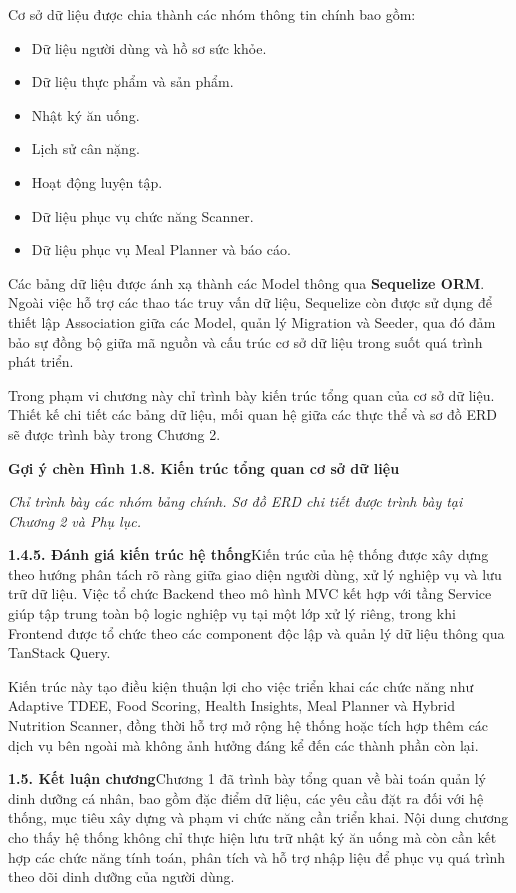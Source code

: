 Cơ sở dữ liệu được chia thành các nhóm thông tin chính bao gồm:

\begin{itemize}
\item Dữ liệu người dùng và hồ sơ sức khỏe.
\item Dữ liệu thực phẩm và sản phẩm.
\item Nhật ký ăn uống.
\item Lịch sử cân nặng.
\item Hoạt động luyện tập.
\item Dữ liệu phục vụ chức năng Scanner.
\item Dữ liệu phục vụ Meal Planner và báo cáo.
\end{itemize}
Các bảng dữ liệu được ánh xạ thành các Model thông qua \textbf{Sequelize ORM}. Ngoài việc hỗ trợ các thao tác truy vấn dữ liệu, Sequelize còn được sử dụng để thiết lập Association giữa các Model, quản lý Migration và Seeder, qua đó đảm bảo sự đồng bộ giữa mã nguồn và cấu trúc cơ sở dữ liệu trong suốt quá trình phát triển.

Trong phạm vi chương này chỉ trình bày kiến trúc tổng quan của cơ sở dữ liệu. Thiết kế chi tiết các bảng dữ liệu, mối quan hệ giữa các thực thể và sơ đồ ERD sẽ được trình bày trong Chương 2.

\textbf{Gợi ý chèn Hình 1.8. Kiến trúc tổng quan cơ sở dữ liệu}

\textit{Chỉ trình bày các nhóm bảng chính. Sơ đồ ERD chi tiết được trình bày tại Chương 2 và Phụ lục.}

\textbf{1.4.5. Đánh giá kiến trúc hệ thống}Kiến trúc của hệ thống được xây dựng theo hướng phân tách rõ ràng giữa giao diện người dùng, xử lý nghiệp vụ và lưu trữ dữ liệu. Việc tổ chức Backend theo mô hình MVC kết hợp với tầng Service giúp tập trung toàn bộ logic nghiệp vụ tại một lớp xử lý riêng, trong khi Frontend được tổ chức theo các component độc lập và quản lý dữ liệu thông qua TanStack Query.

Kiến trúc này tạo điều kiện thuận lợi cho việc triển khai các chức năng như Adaptive TDEE, Food Scoring, Health Insights, Meal Planner và Hybrid Nutrition Scanner, đồng thời hỗ trợ mở rộng hệ thống hoặc tích hợp thêm các dịch vụ bên ngoài mà không ảnh hưởng đáng kể đến các thành phần còn lại.

\textbf{1.5. Kết luận chương}Chương 1 đã trình bày tổng quan về bài toán quản lý dinh dưỡng cá nhân, bao gồm đặc điểm dữ liệu, các yêu cầu đặt ra đối với hệ thống, mục tiêu xây dựng và phạm vi chức năng cần triển khai. Nội dung chương cho thấy hệ thống không chỉ thực hiện lưu trữ nhật ký ăn uống mà còn cần kết hợp các chức năng tính toán, phân tích và hỗ trợ nhập liệu để phục vụ quá trình theo dõi dinh dưỡng của người dùng.

